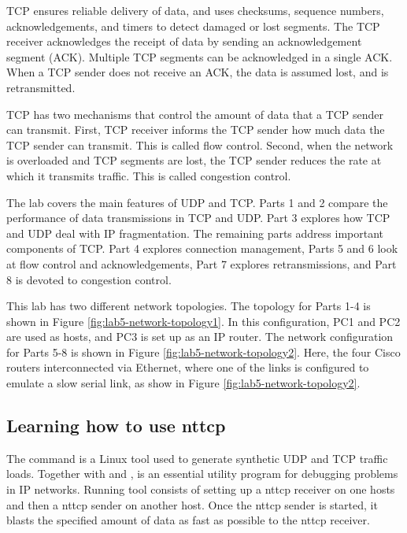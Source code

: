 TCP ensures reliable delivery of data, and uses checksums, sequence numbers, acknowledgements, and timers to detect damaged or lost segments. The TCP receiver acknowledges the receipt of data by sending an acknowledgement segment (ACK). Multiple TCP segments can be acknowledged in a single ACK. When a TCP sender does not receive an ACK, the data is assumed lost, and is retransmitted.

TCP has two mechanisms that control the amount of data that a TCP sender can transmit. First, TCP receiver informs the TCP sender how much data the TCP sender can transmit. This is called flow control. Second, when the network is overloaded and TCP segments are lost, the TCP sender reduces the rate at which it transmits traffic. This is called congestion control.

The lab covers the main features of UDP and TCP. Parts 1 and 2 compare the performance of data transmissions in TCP and UDP. Part 3 explores how TCP and UDP deal with IP fragmentation. The remaining parts address important components of TCP. Part 4 explores connection management, Parts 5 and 6 look at flow control and acknowledgements, Part 7 explores retransmissions, and Part 8 is devoted to congestion control.

This lab has two different network topologies. The topology for Parts 1-4 is shown in Figure \ref{fig:lab5-network-topology1}. In this configuration, PC1 and PC2 are used as hosts, and PC3 is set up as an IP router. The network configuration for Parts 5-8 is shown in Figure \ref{fig:lab5-network-topology2}. Here, the four Cisco routers interconnected via Ethernet, where one of the links is configured to emulate a slow serial link, as show in Figure \ref{fig:lab5-network-topology2}.

\newpage
\subsection{Learning how to use nttcp}

The  command is a Linux tool used to generate synthetic UDP and TCP traffic loads. Together with  and ,  is an essential utility program for debugging problems in IP networks. Running  tool consists of setting up a nttcp receiver on one hosts and then a nttcp sender on another host. Once the nttcp sender is started, it blasts the specified amount of data as fast as possible to the nttcp receiver.


